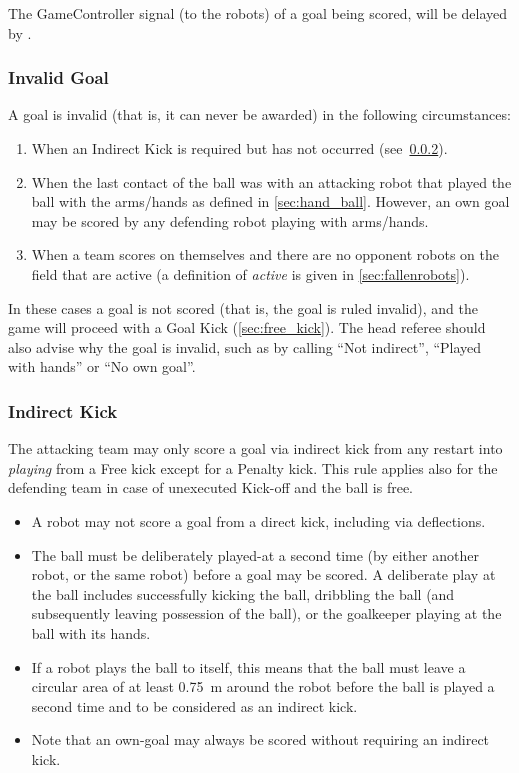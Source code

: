 The GameController signal (to the robots) of a goal being scored, will be delayed by \GoalScoredDelay.

\subsubsection{Invalid Goal}
\label{sec:invalid_goal}

A goal is invalid (that is, it can never be awarded) in the following circumstances:
\begin{enumerate}
    \item When an Indirect Kick is required but has not occurred (see~\cref{sec:indirect_kick}).
    \item When the last contact of the ball was with an attacking robot that played the ball with the arms/hands as defined in \cref{sec:hand_ball}. However, an own goal may be scored by any defending robot playing with arms/hands.
    \item When a team scores on themselves and there are no opponent robots on the field that are active (a definition of \emph{active} is given in \cref{sec:fallenrobots}).
\end{enumerate}

In these cases a goal is not scored (that is, the goal is ruled invalid), and the game will proceed with a Goal Kick (\cf \cref{sec:free_kick}). The head referee should also advise why the goal is invalid, such as by calling ``Not indirect'', ``Played with hands'' or ``No own goal''.

\subsubsection{Indirect Kick}
\label{sec:indirect_kick}

The attacking team may only score a goal via indirect kick from any restart into \textit{playing} from a Free kick except for a Penalty kick. This rule applies also for the defending team in case of unexecuted Kick-off and the ball is free. 

\begin{itemize}
  \item A robot may not score a goal from a direct kick, including via deflections.
  \item The ball must be deliberately played-at a second time (by either another robot, or the same robot) before a goal may be scored. A deliberate play at the ball includes successfully kicking the ball, dribbling the ball (and subsequently leaving possession of the ball), or the goalkeeper playing at the ball with its hands.
  \item If a robot plays the ball to itself, this means that the ball must leave a circular area of at least \qty{0.75}{\metre} around the robot before the ball is played a second time and to be considered as an indirect kick.
  \item Note that an own-goal may always be scored without requiring an indirect kick.
\end{itemize}

